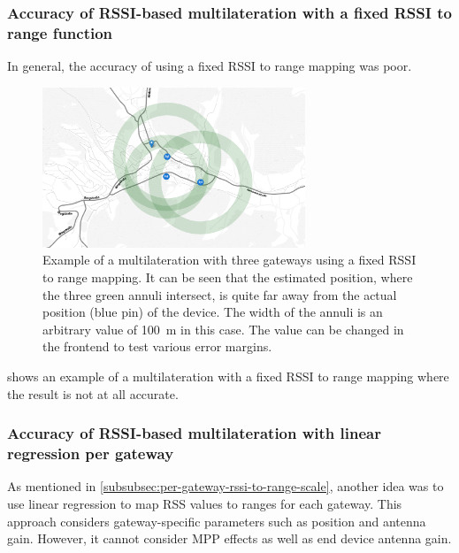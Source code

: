 \subsubsection{Accuracy of \acs{RSSI}-based multilateration with a fixed \acs{RSSI} to range function}\label{subsubsec:conclusion-rssi-fixed-scale}

In general, the accuracy of using a fixed \ac{RSSI} to range mapping was poor.

\begin{figure}[htbp]
    \centering
    \includegraphics[width=0.7\textwidth]{pictures/ttn-locator/frontend/multilateration/rssi_range_multilateration_bad_example.png}
    \caption{
        Example of a multilateration with three gateways using a fixed \ac{RSSI} to range mapping.
        It can be seen that the estimated position, where the three green annuli intersect, is quite far away from the actual position (blue pin) of the device.
        The width of the annuli is an arbitrary value of \SI{100}{\meter} in this case.
        The value can be changed in the frontend to test various error margins.
    }\label{pic:bad-rssi-to-range-multilateration-example}
\end{figure}

 shows an example of a multilateration with a fixed \ac{RSSI} to range mapping where the result is not at all accurate.

\subsubsection{Accuracy of \acs{RSSI}-based multilateration with linear regression per gateway}\label{subsubsec:conclusion-rssi-linear-regression}

As mentioned in \cref{subsubsec:per-gateway-rssi-to-range-scale}, another idea was to use linear regression to map \ac{RSS} values to ranges for each gateway.
This approach considers gateway-specific parameters such as position and antenna gain.
However, it cannot consider \ac{MPP} effects as well as end device antenna gain.

